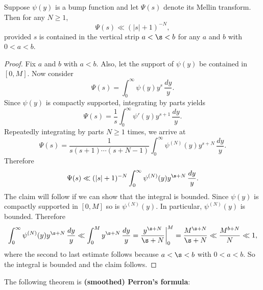     \begin{proposition}\label{prop:smoothing_function_Mellin_inverse_vertical_strips}
      Suppose $\psi(y)$ is a bump function and let $\Psi(s)$ denote its Mellin transform. Then for any $N \ge 1$,
      \[
        \Psi(s) \ll (|s|+1)^{-N},
      \]
      provided $s$ is contained in the vertical strip $a < \s < b$ for any $a$ and $b$ with $0 < a < b$.
    \end{proposition}
    \begin{proof}
      Fix $a$ and $b$ with $a < b$. Also, let the support of $\psi(y)$ be contained in $[0,M]$. Now consider
      \[
        \Psi(s) = \int_{0}^{\infty}\psi(y)y^{s}\,\frac{dy}{y}.
      \]
      Since $\psi(y)$ is compactly supported, integrating by parts yields
      \[
        \Psi(s) = \frac{1}{s}\int_{0}^{\infty}\psi'(y)y^{s+1}\,\frac{dy}{y}.
      \]
      Repeatedly integrating by parts $N \ge 1$ times, we arrive at
      \[
        \Psi(s) = \frac{1}{s(s+1) \cdots (s+N-1)}\int_{0}^{\infty}\psi^{(N)}(y)y^{s+N}\,\frac{dy}{y}.
      \]
      Therefore
      \[
        \Psi(s) \ll (|s|+1)^{-N}\int_{0}^{\infty}\psi^{(N)}(y)y^{\s+N}\,\frac{dy}{y}.
      \]
      The claim will follow if we can show that the integral is bounded. Since $\psi(y)$ is compactly supported in $[0,M]$ so is $\psi^{(N)}(y)$. In particular, $\psi^{(N)}(y)$ is bounded. Therefore
      \[
        \int_{0}^{\infty}\psi^{(N)}(y)y^{\s+N}\,\frac{dy}{y} \ll \int_{0}^{M}y^{\s+N}\,\frac{dy}{y} = \frac{y^{\s+N}}{\s+N}\bigg|_{0}^{M} = \frac{M^{\s+N}}{\s+N} \ll \frac{M^{b+N}}{N} \ll 1,
      \]
      where the second to last estimate follows because $a < \s < b$ with $0 < a < b$. So the integral is bounded and the claim follows.
    \end{proof}
    
    The following theorem is \textbf{(smoothed) Perron's formula}:

